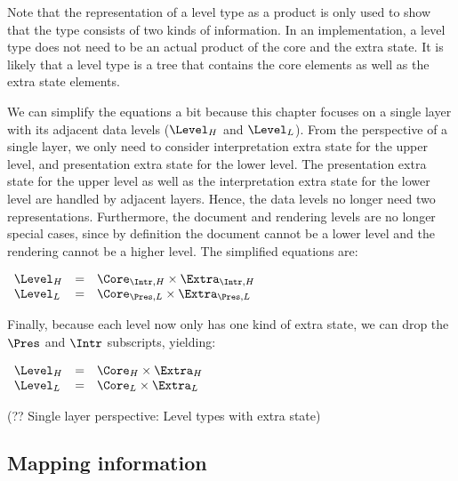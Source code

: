 Note that the representation of a level type as a product is only used to show that the type consists of two kinds of information. In an implementation, a level type does not need to be an actual product of the core and the extra state. It is likely that a level type is a tree that contains the core elements as well as the extra state elements.

We can simplify the equations a bit because this chapter focuses on a single layer with its adjacent data levels ($\Level_{H}$ and $\Level_{L}$). From the perspective of a single layer, we only need to consider interpretation extra state for the upper level, and presentation extra state for the lower level. The presentation extra state for the upper level as well as the interpretation extra state for the lower level are handled by adjacent layers. Hence, the data levels no longer need two representations. Furthermore, the document and rendering levels are no longer special cases, since by definition the document cannot be a lower level and the rendering cannot be a higher level. The simplified equations are:

\begin{small}\( \begin{array}{lcll}
\Level_{H} & = & \Core_{\Intr, H} \times \Extra_{\Intr, H}\\
\Level_{L} & = & \Core_{\Pres, L} \times \Extra_{\Pres, L}\\
\end{array}\)\end{small}

Finally, because each level now only has one kind of extra state, we can drop the $\Pres$ and $\Intr$ subscripts, yielding:

\begin{small}\( \begin{array}{lcll}
\Level_{H} & = & \Core_{H} \times \Extra_{H}\\
\Level_{L} & = & \Core_{L} \times \Extra_{L}\\
\end{array}\)\end{small}
\begin{center}(?? Single layer perspective: Level types with extra state) \end{center}\vspace{1em}


%																
\subsection{Mapping information} \label{sect:mappingInformation}

